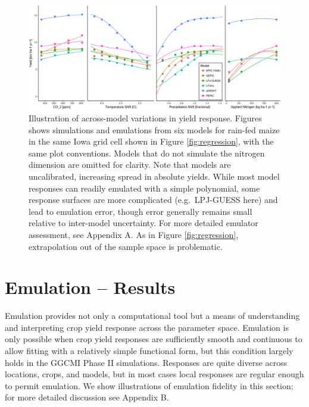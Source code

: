 \documentclass[preprint, 5p, times, twocolumn]{elsarticle}
\begin{document}
\begin{figure}[!!h]
\centering
    \includegraphics[width=0.95\linewidth]{figures/regression_model.png}
    \caption{Illustration of across-model variations in yield response. Figures shows simulations and emulations from six models for rain-fed maize in the same Iowa grid cell shown in Figure \ref{fig:regression}, with the same plot conventions. Models that do not simulate the nitrogen dimension are omitted for clarity. Note that models are uncalibrated, increasing spread in absolute yields.  %
While most model responses can readily emulated with a simple polynomial, some response surfaces are more complicated (e.g.\  LPJ-GUESS here) and lead to emulation error, though error generally remains small relative to inter-model uncertainty. For more detailed emulator assessment, see Appendix A. As in Figure \ref{fig:regression}, extrapolation out of the sample space is problematic. 
}
   \label{fig:regression_iowa}
\end{figure}


\section{Emulation -- Results}
\label{S:5}
Emulation provides not only a computational tool but a means of understanding and interpreting crop yield response across the parameter space. Emulation is only possible  when crop yield responses are sufficiently smooth and continuous to allow fitting with a relatively simple functional form, but this condition largely holds in the GGCMI Phase II simulations. 
Responses are quite diverse across locations, crops, and models, but in most cases local responses are regular enough to permit emulation. We show illustrations of emulation fidelity in this section; for more detailed discussion see Appendix B.
\end{document}
